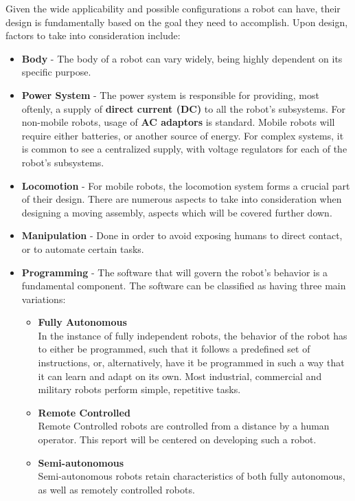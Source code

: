 \documentclass[12p,a4paper]{report}
\begin{document}
Given the wide applicability and possible configurations a robot can have, their design is fundamentally based on the goal they need to accomplish. Upon design, factors to take into consideration include:
\begin{itemize}
\setlength\itemsep{-0.2em}
\item \textbf{Body} - The body of a robot can vary widely, being highly dependent on its specific purpose.
\item \textbf{Power System} - The power system is responsible for providing, most oftenly, a supply of \textbf{direct current (DC)} to all the robot's subsystems. For non-mobile robots, usage of \textbf{AC adaptors} is standard. Mobile robots will require either batteries, or another source of energy. For complex systems, it is common to see a centralized supply, with voltage regulators for each of the robot's subsystems. 
\item \textbf{Locomotion} - For mobile robots, the locomotion system forms a crucial part of their design. There are numerous aspects to take into consideration when designing a moving assembly, aspects which will be covered further down.
\item \textbf{Manipulation} - Done in order to avoid exposing humans to direct contact, or to automate certain tasks.
\item \textbf{Programming} - The software that will govern the robot's behavior is a fundamental component. The software can be classified as having three main variations:
\begin{itemize}
\item \textbf{Fully Autonomous} \\
	In the instance of fully independent robots, the behavior of the robot has to either be programmed, such that it follows a predefined set of instructions, or, alternatively, have it be programmed in such a way that it can learn and adapt on its own. Most industrial, commercial and military robots perform simple, repetitive tasks.
	\item \textbf{Remote Controlled} \\
	Remote Controlled robots are controlled from a distance by a human operator. This report will be centered on developing such a robot.
	\item \textbf{Semi-autonomous} \\
	Semi-autonomous robots retain characteristics of both fully autonomous, as well as remotely controlled robots.
\end{itemize}

\end{itemize}
\end{document}

